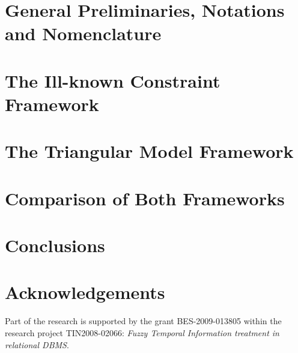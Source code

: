 \documentclass[twocolumn,a4paper]{article}
\theoremstyle{definition}
\begin{document}
\section{\label{sec:general-preliminaries}General Preliminaries, Notations and Nomenclature}


\section{\label{sec:ikc}The Ill-known Constraint Framework}


\section{\label{sec:tm}The Triangular Model Framework}


\section{\label{sec:proposal}Comparison of Both Frameworks}


\section{\label{sec:conclusions}Conclusions}


\section*{Acknowledgements}
Part of the research is supported by the grant BES-2009-013805 within the research project TIN2008-02066: \emph{Fuzzy Temporal Information treatment in relational DBMS}.









\end{document}
